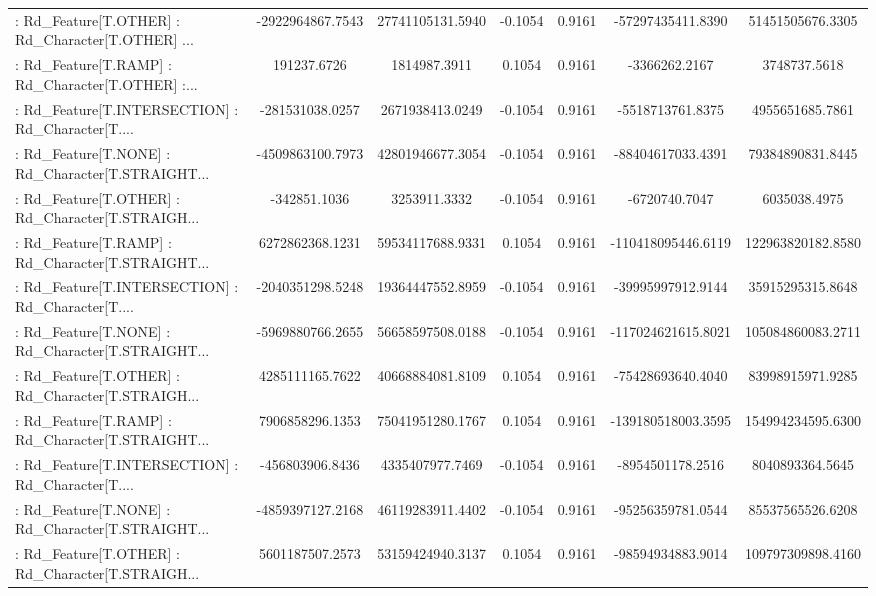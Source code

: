 \begin{longtable}{p{4cm}cccccc}
 : Rd\_Feature[T.OTHER] : Rd\_Character[T.OTHER] ... &  -2922964867.7543 &  27741105131.5940 & -0.1054 &       0.9161 &  -57297435411.8390 &  51451505676.3305 \\
 : Rd\_Feature[T.RAMP] : Rd\_Character[T.OTHER] :... &       191237.6726 &      1814987.3911 &  0.1054 &       0.9161 &      -3366262.2167 &      3748737.5618 \\
 : Rd\_Feature[T.INTERSECTION] : Rd\_Character[T.... &   -281531038.0257 &   2671938413.0249 & -0.1054 &       0.9161 &   -5518713761.8375 &   4955651685.7861 \\
 : Rd\_Feature[T.NONE] : Rd\_Character[T.STRAIGHT... &  -4509863100.7973 &  42801946677.3054 & -0.1054 &       0.9161 &  -88404617033.4391 &  79384890831.8445 \\
 : Rd\_Feature[T.OTHER] : Rd\_Character[T.STRAIGH... &      -342851.1036 &      3253911.3332 & -0.1054 &       0.9161 &      -6720740.7047 &      6035038.4975 \\
 : Rd\_Feature[T.RAMP] : Rd\_Character[T.STRAIGHT... &   6272862368.1231 &  59534117688.9331 &  0.1054 &       0.9161 & -110418095446.6119 & 122963820182.8580 \\
 : Rd\_Feature[T.INTERSECTION] : Rd\_Character[T.... &  -2040351298.5248 &  19364447552.8959 & -0.1054 &       0.9161 &  -39995997912.9144 &  35915295315.8648 \\
 : Rd\_Feature[T.NONE] : Rd\_Character[T.STRAIGHT... &  -5969880766.2655 &  56658597508.0188 & -0.1054 &       0.9161 & -117024621615.8021 & 105084860083.2711 \\
 : Rd\_Feature[T.OTHER] : Rd\_Character[T.STRAIGH... &   4285111165.7622 &  40668884081.8109 &  0.1054 &       0.9161 &  -75428693640.4040 &  83998915971.9285 \\
 : Rd\_Feature[T.RAMP] : Rd\_Character[T.STRAIGHT... &   7906858296.1353 &  75041951280.1767 &  0.1054 &       0.9161 & -139180518003.3595 & 154994234595.6300 \\
 : Rd\_Feature[T.INTERSECTION] : Rd\_Character[T.... &   -456803906.8436 &   4335407977.7469 & -0.1054 &       0.9161 &   -8954501178.2516 &   8040893364.5645 \\
 : Rd\_Feature[T.NONE] : Rd\_Character[T.STRAIGHT... &  -4859397127.2168 &  46119283911.4402 & -0.1054 &       0.9161 &  -95256359781.0544 &  85537565526.6208 \\
 : Rd\_Feature[T.OTHER] : Rd\_Character[T.STRAIGH... &   5601187507.2573 &  53159424940.3137 &  0.1054 &       0.9161 &  -98594934883.9014 & 109797309898.4160 \\

\end{longtable}
